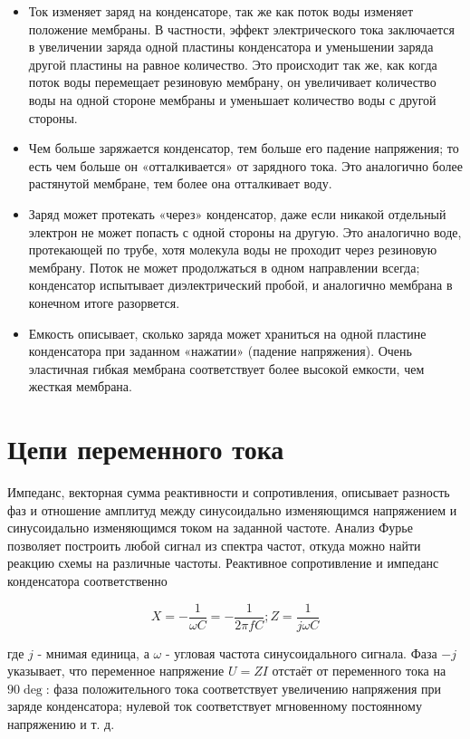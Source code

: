 \begin{itemize}
	\item Ток изменяет заряд на конденсаторе, так же как поток воды изменяет положение мембраны. В частности, эффект электрического тока заключается в увеличении заряда одной пластины конденсатора и уменьшении заряда другой пластины на равное количество. Это происходит так же, как когда поток воды перемещает резиновую мембрану, он увеличивает количество воды на одной стороне мембраны и уменьшает количество воды с другой стороны.
	\item Чем больше заряжается конденсатор, тем больше его падение напряжения; то есть чем больше он «отталкивается» от зарядного тока. Это аналогично более растянутой мембране, тем более она отталкивает воду.
	\item Заряд может протекать «через» конденсатор, даже если никакой отдельный электрон не может попасть с одной стороны на другую. Это аналогично воде, протекающей по трубе, хотя молекула воды не проходит через резиновую мембрану. Поток не может продолжаться в одном направлении всегда; конденсатор испытывает диэлектрический пробой, и аналогично мембрана в конечном итоге разорвется.
	\item Емкость описывает, сколько заряда может храниться на одной пластине конденсатора при заданном «нажатии» (падение напряжения). Очень эластичная гибкая мембрана соответствует более высокой емкости, чем жесткая мембрана.
\end{itemize}


\chapter{Цепи переменного тока}

Импеданс, векторная сумма реактивности и сопротивления, описывает разность фаз и отношение амплитуд между синусоидально изменяющимся напряжением и синусоидально изменяющимся током на заданной частоте. Анализ Фурье позволяет построить любой сигнал из спектра частот, откуда можно найти реакцию схемы на различные частоты. Реактивное сопротивление и импеданс конденсатора соответственно

\[
X = - \frac{1}{\omega C} = - \frac{1}{2 \pi f  C}; 
Z = \frac{1}{j \omega C}
\]

где $j$ - мнимая единица, а $\omega$ - угловая частота синусоидального сигнала. Фаза $-j$ указывает, что переменное напряжение $U = ZI$ отстаёт от переменного тока на $90\deg $: фаза положительного тока соответствует увеличению напряжения при заряде конденсатора; нулевой ток соответствует мгновенному постоянному напряжению и т. д.

